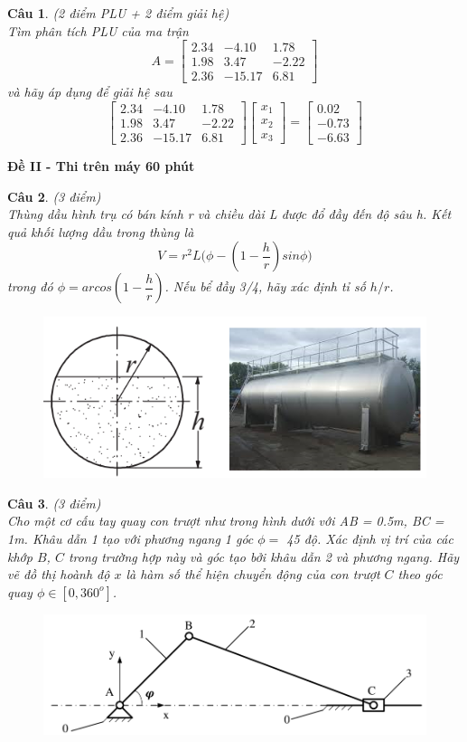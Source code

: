 \documentclass[11pt]{article}
\newtheorem{bt}{Câu}
\newcommand{\m}[1]{
	\begin{bmatrix}
		#1
	\end{bmatrix}
}
\begin{document}
\begin{bt}(2 điểm PLU + 2 điểm giải hệ) \\
Tìm phân tích PLU của ma trận 
\[
A = \m{2.34 & -4.10 &  1.78 \\
	1.98  & 3.47 &  -2.22 \\
	2.36  & -15.17 &  6.81}
\]
và hãy áp dụng để giải hệ sau
%
\[
\m{2.34 & -4.10 &  1.78 \\
	1.98  & 3.47 &  -2.22 \\
	2.36  & -15.17 &  6.81} 
\m{x_1 \\ x_2 \\ x_3} = \m{0.02 \\ 	-0.73 \\ -6.63}
\]
%
\end{bt}
\cleardoublepage

\begin{center}	
	\textbf{ Đề II - Thi trên máy 60 phút}
\end{center}

\begin{bt}(3 điểm) \\ %
	Thùng dầu hình trụ có bán kính r và chiều dài L được đổ đầy đến độ sâu h. Kết quả
	khối lượng dầu trong thùng là
	\[
	V = r^2L \Big( \phi - \left(1 - \dfrac{h}{r}\right) sin \phi \Big)
	\]
	trong đó $\phi = arcos\left(1 - \dfrac{h}{r}\right)$. Nếu bể đầy 3/4, hãy xác định tỉ số $h/r$.
	
	\begin{figure}[h!]
		\centering
		\includegraphics[width=0.7\linewidth]{oil_tank}
		\caption{}
		\label{fig:oiltank}
	\end{figure}
\end{bt}


\begin{bt}(3 điểm) \\
Cho một cơ cấu tay quay con trượt như trong hình dưới với AB = 0.5m, BC = 1m. Khâu dẫn 1 tạo với phương ngang 1 góc $\phi = $ 45 độ. Xác định vị trí của các khớp $B$, $C$ trong trường hợp này và góc tạo bởi khâu dẫn 2 và phương ngang. 
Hãy vẽ đồ thị hoành độ $x$ là hàm số thể hiện chuyển động của con trượt $C$ theo góc quay $\phi \in [0,360^o]$.
\begin{figure}[h!]
	\centering
	\includegraphics[width=0.7\linewidth]{tay_quay}
	\caption{}
	\label{fig:tayquay}
\end{figure}
\end{bt}
\end{document}
